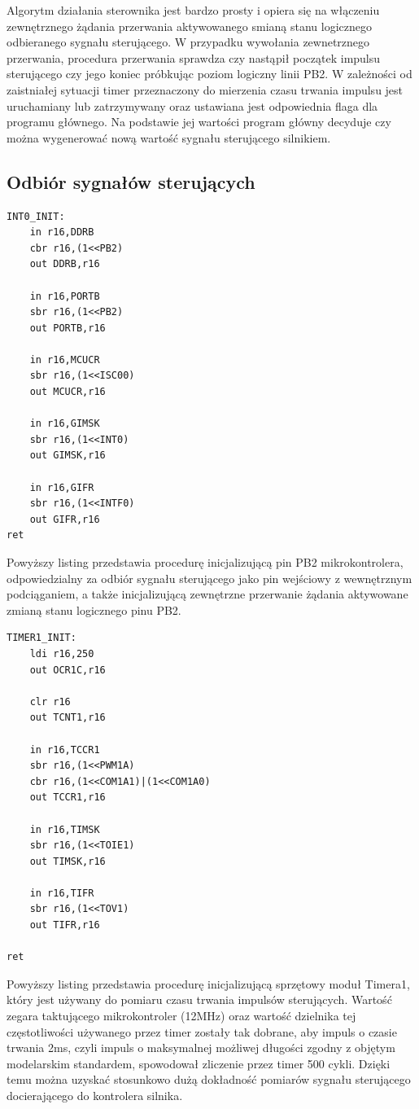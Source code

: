 Algorytm działania sterownika jest bardzo prosty i opiera się na włączeniu zewnętrznego żądania przerwania aktywowanego smianą stanu logicznego odbieranego sygnału sterującego. W przypadku wywołania zewnetrznego przerwania, procedura przerwania sprawdza czy nastąpił początek impulsu sterującego czy jego koniec próbkując poziom logiczny linii PB2. W zależności od zaistniałej sytuacji timer przeznaczony do mierzenia czasu trwania impulsu jest uruchamiany lub zatrzymywany oraz ustawiana jest odpowiednia flaga dla programu głównego. Na podstawie jej wartości program główny decyduje czy można wygenerować nową wartość sygnału sterującego silnikiem.


\subsection{Odbiór sygnałów sterujących}

\begin{lstlisting}
INT0_INIT:
	in r16,DDRB
	cbr r16,(1<<PB2)
	out DDRB,r16	

	in r16,PORTB
	sbr r16,(1<<PB2)
	out PORTB,r16

	in r16,MCUCR
	sbr r16,(1<<ISC00)
	out MCUCR,r16

	in r16,GIMSK
	sbr r16,(1<<INT0)
	out GIMSK,r16

	in r16,GIFR
	sbr r16,(1<<INTF0)
	out GIFR,r16
ret
\end{lstlisting}

Powyższy listing przedstawia procedurę inicjalizującą pin PB2 mikrokontrolera, odpowiedzialny za odbiór sygnału sterującego jako pin wejściowy z wewnętrznym podciąganiem, a także inicjalizującą zewnętrzne przerwanie żądania aktywowane zmianą stanu logicznego pinu PB2. 

\begin{lstlisting}
TIMER1_INIT:
	ldi r16,250
	out OCR1C,r16

	clr r16
	out TCNT1,r16

	in r16,TCCR1
	sbr r16,(1<<PWM1A)
	cbr r16,(1<<COM1A1)|(1<<COM1A0)
	out TCCR1,r16

	in r16,TIMSK
	sbr r16,(1<<TOIE1)
	out TIMSK,r16

	in r16,TIFR
	sbr r16,(1<<TOV1)
	out TIFR,r16
	
ret
\end{lstlisting}
 
Powyższy listing przedstawia procedurę inicjalizującą sprzętowy moduł Timera1, który jest używany do pomiaru czasu trwania impulsów sterujących. Wartość zegara taktującego mikrokontroler (12MHz) oraz wartość dzielnika tej częstotliwości używanego przez timer zostały tak dobrane, aby impuls o czasie trwania 2ms, czyli impuls o maksymalnej możliwej długości zgodny z objętym modelarskim standardem, spowodował zliczenie przez timer 500 cykli. Dzięki temu można uzyskać stosunkowo dużą dokładność pomiarów sygnału sterującego docierającego do kontrolera silnika. 

